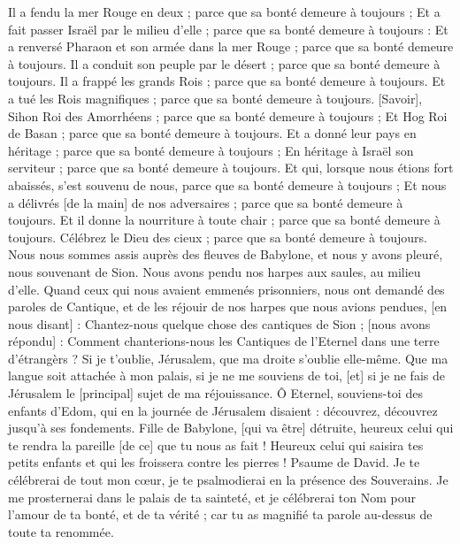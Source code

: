 \begin{multicols}{2}
Il a fendu la mer Rouge en deux ; parce que sa bonté demeure à toujours ;
Et a fait passer Israël par le milieu d'elle ; parce que sa bonté demeure à toujours :
Et a renversé Pharaon et son armée dans la mer Rouge ; parce que sa bonté demeure à toujours.
Il a conduit son peuple par le désert ; parce que sa bonté demeure à toujours.
Il a frappé les grands Rois ; parce que sa bonté demeure à toujours.
Et a tué les Rois magnifiques ; parce que sa bonté demeure à toujours.
[Savoir], Sihon Roi des Amorrhéens ; parce que sa bonté demeure à toujours ;
Et Hog Roi de Basan ; parce que sa bonté demeure à toujours.
Et a donné leur pays en héritage ; parce que sa bonté demeure à toujours ;
En héritage à Israël son serviteur ; parce que sa bonté demeure à toujours.
Et qui, lorsque nous étions fort abaissés, s'est souvenu de nous, parce que sa bonté demeure à toujours ;
Et nous a délivrés [de la main] de nos adversaires ; parce que sa bonté demeure à toujours.
Et il donne la nourriture à toute chair ; parce que sa bonté demeure à toujours.
Célébrez le Dieu des cieux ; parce que sa bonté demeure à toujours.
\VerseOne{}Nous nous sommes assis auprès des fleuves de Babylone, et nous y avons pleuré, nous souvenant de Sion.
Nous avons pendu nos harpes aux saules, au milieu d'elle.
Quand ceux qui nous avaient emmenés prisonniers, nous ont demandé des paroles de Cantique, et de les réjouir de nos harpes que nous avions pendues, [en nous disant] : Chantez-nous quelque chose des cantiques de Sion ; [nous avons répondu] :
Comment chanterions-nous les Cantiques de l'Eternel dans une terre d’étrangèrs ?
Si je t'oublie, Jérusalem, que ma droite s'oublie elle-même.
Que ma langue soit attachée à mon palais, si je ne me souviens de toi, [et] si je ne fais de Jérusalem le [principal] sujet de ma réjouissance.
Ô Eternel, souviens-toi des enfants d'Edom, qui en la journée de Jérusalem disaient : découvrez, découvrez jusqu’à ses fondements.
Fille de Babylone, [qui va être] détruite, heureux celui qui te rendra la pareille [de ce] que tu nous as fait !
Heureux celui qui saisira tes petits enfants et qui les froissera contre les pierres !
\VerseOne{}Psaume de David. Je te célébrerai de tout mon cœur, je te psalmodierai en la présence des Souverains.
Je me prosternerai dans le palais de ta sainteté, et je célébrerai ton Nom pour l'amour de ta bonté, et de ta vérité ; car tu as magnifié ta parole au-dessus de toute ta renommée.

\end{multicols}

